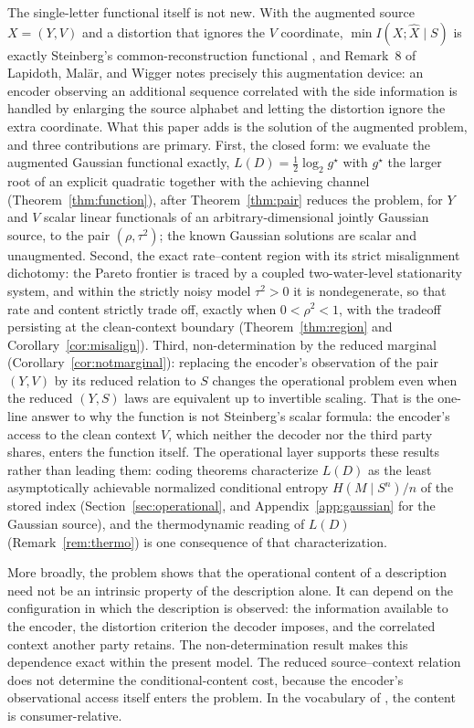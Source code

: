 ﻿\documentclass[11pt,onecolumn]{IEEEtran}
\newcommand{\hX}{\widehat{X}}
\begin{document}
The single-letter functional itself is not new. With the augmented source
$X=(Y,V)$ and a distortion that ignores the $V$ coordinate,
$\min I(X;\hX\mid S)$ is exactly Steinberg's common-reconstruction
functional \cite{steinberg2009}, and Remark~8 of Lapidoth, Mal\"ar, and
Wigger \cite{lapidoth2014} notes precisely this augmentation device: an
encoder observing an additional sequence correlated with the side
information is handled by enlarging the source alphabet and letting the
distortion ignore the extra coordinate. What this paper adds is the
solution of the augmented problem, and three contributions are primary.
First, the closed form: we evaluate the augmented Gaussian functional
exactly, $L(D)=\tfrac12\log_2 g^\star$ with $g^\star$ the larger root of
an explicit quadratic together with the achieving channel
(Theorem~\ref{thm:function}), after Theorem~\ref{thm:pair} reduces the
problem, for $Y$ and $V$ scalar linear functionals of an
arbitrary-dimensional jointly Gaussian source, to the pair
$(\rho,\tau^2)$; the known Gaussian solutions
\cite{steinberg2009,lapidoth2014} are scalar and unaugmented. Second, the
exact rate--content region with its strict misalignment dichotomy: the
Pareto frontier is traced by a coupled two-water-level stationarity
system, and within the strictly noisy model $\tau^2>0$ it is
nondegenerate, so that rate and content strictly trade off, exactly when
$0<\rho^2<1$, with the tradeoff persisting at the clean-context boundary
(Theorem~\ref{thm:region} and Corollary~\ref{cor:misalign}). Third,
non-determination by the reduced marginal
(Corollary~\ref{cor:notmarginal}): replacing the encoder's observation of
the pair $(Y,V)$ by its reduced relation to $S$ changes the operational
problem even when the reduced $(Y,S)$ laws are equivalent up to invertible
scaling. That is the one-line answer to why the function is not
Steinberg's scalar formula: the encoder's access to the clean context
$V$, which neither the decoder nor the third party shares, enters the
function itself. The operational layer supports these results rather than
leading them: coding theorems characterize $L(D)$ as the least
asymptotically achievable normalized conditional entropy $H(M\mid S^n)/n$
of the stored index (Section~\ref{sec:operational}, and
Appendix~\ref{app:gaussian} for the Gaussian source), and the
thermodynamic reading of $L(D)$ (Remark~\ref{rem:thermo}) is one
consequence of that characterization.

More broadly, the problem shows that the operational content of a
description need not be an intrinsic property of the description alone.
It can depend on the configuration in which the description is observed:
the information available to the encoder, the distortion criterion the
decoder imposes, and the correlated context another party retains. The
non-determination result makes this dependence exact within the present
model. The reduced source--context relation does not determine the
conditional-content cost, because the encoder's observational access
itself enters the problem. In the vocabulary of \cite{bond2026landauer},
the content is consumer-relative.
\end{document}
